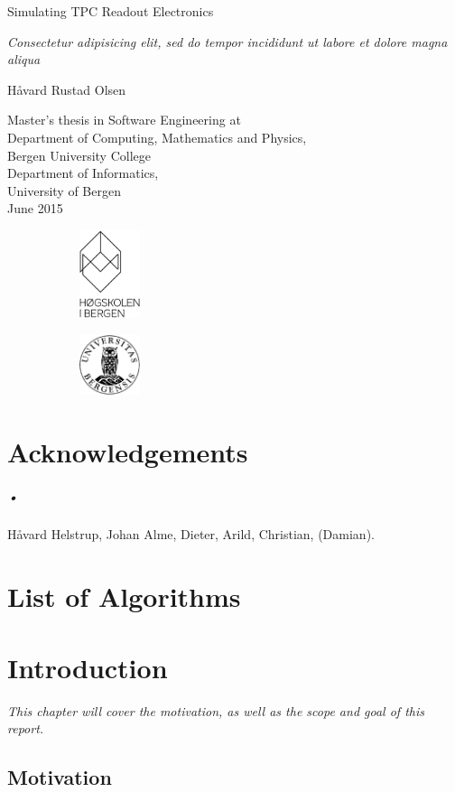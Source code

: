 \documentclass[a4paper]{report}
\newcommand*{\titlePage}{\begingroup %
\fontfamily{phv}\selectfont
\centering %

\vspace{200pt}
{\Huge Simulating TPC Readout Electronics} \\ %
\vspace{5pt}

{\Large \textsl{Consectetur adipisicing elit, sed do tempor incididunt ut labore et dolore magna aliqua}} %
\vspace{50pt}

{\Large{H\r{a}vard Rustad Olsen}}\\ %

\vfill %

{\Large Master's thesis in Software Engineering at \\
\vspace{10pt}
Department of Computing, Mathematics and Physics, \\
Bergen University College \\
\vspace{10pt}
Department of  Informatics, \\
University of Bergen \\}
\vspace{10pt}
{\large June 2015} %


\begin{figure}[h]
		\begin{subfigure}[]{50pt}
			\includegraphics[width=50pt]{HIB_sort_hovedlogo.eps}
		\end{subfigure}
		\hfill
		\begin{subfigure}[]{50pt}
			\includegraphics[width=50pt]{uib-logo.eps}
		\end{subfigure}

\end{figure}

\endgroup}
\begin{document}
\pagestyle{plain} %

\titlePage %

\newpage

\chapter*{Acknowledgements}

\paragraph{•}
Håvard Helstrup, Johan Alme, Dieter, Arild, Christian, (Damian).
\newpage

{}
\tableofcontents

\newpage
{}
{}
\listoffigures

\newpage
{}
{}
\listoftables

\newpage
\chapter*{List of Algorithms}

\newpage
{}
{}
\lstlistoflistings
\newpage

\printglossaries
\newpage

\chapter{Introduction}
\textit{This chapter will cover the motivation, as well as the scope and goal of this report.}

\section{Motivation}
\label{sec:motivation}
\end{document}
